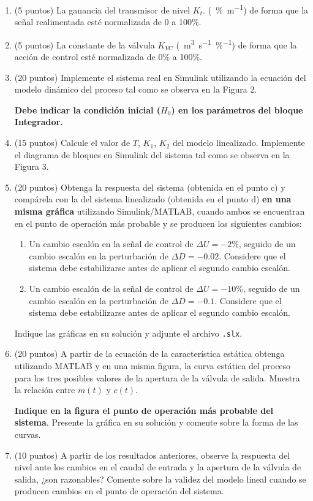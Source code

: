 \begin{enumerate}[label=\alph*), start=2]
    \item (5 puntos) La ganancia del transmisor de nivel $K_t$. (\SI{}{\%\metre\tothe{-1}}) de forma que la señal
realimentada esté normalizada de 0 a 100\%.


    \item (5 puntos) La constante de la válvula $K _{VC}$ (\SI{}{\metre\cubed\second\tothe{-1}\%\tothe{-1}}) de forma que la acción de control esté normalizada de 0\% a 100\%.


    \item (20 puntos) Implemente el sistema real en Simulink utilizando la ecuación del modelo
        dinámico del proceso tal como se observa en la Figura 2. %

        \textbf{Debe indicar la condición inicial ($H_0$) en los parámetros del bloque Integrador.}
    \item (15 puntos) Calcule el valor de $T$, $K_1$, $K_2$ del modelo linealizado. Implemente el diagrama de bloques en Simulink del sistema tal como se observa en la Figura 3.

    \item (20 puntos) Obtenga la respuesta del sistema (obtenida en el punto c) y compárela con la del sistema linealizado (obtenida en el punto d) \textbf{en una misma gráfica} utilizando Simulink/MATLAB, cuando ambos se encuentran en el punto de operación más probable y se producen los siguientes cambios:

        \begin{enumerate}[label=\roman*.]
            \item Un cambio escalón en la señal de control de $\Delta U = -2\%$, seguido de un cambio escalón en la perturbación de $\Delta D = -0.02$.
                Considere que el sistema debe estabilizarse antes de aplicar el segundo cambio escalón.
            \item Un cambio escalón de la señal de control de $\Delta U = -10\%$, seguido de un cambio escalón en la perturbación de $\Delta D = -0.1$. Considere que el sistema debe estabilizarse antes de aplicar el segundo cambio escalón.
        \end{enumerate}
        Indique las gráficas en su solución y adjunte el archivo \texttt{.slx}.
    \item (20 puntos) A partir de la ecuación de la característica estática obtenga utilizando MATLAB
y en una misma figura, la curva estática del proceso para los tres posibles valores de la
apertura de la válvula de salida. Muestra la relación entre $m(t)$ y $c(t)$. 

\textbf{Indique en la figura el punto de operación más probable del sistema}. Presente la gráfica en su solución y comente sobre la forma de las curvas.
    \item (10 puntos) A partir de los resultados anteriores, observe la respuesta del nivel ante los
cambios en el caudal de entrada y la apertura de la válvula de salida, ¿son razonables?
Comente sobre la validez del modelo lineal cuando se producen cambios en el punto
de operación del sistema.

\end{enumerate}

